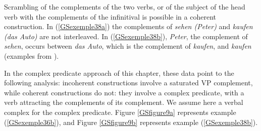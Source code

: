 \documentclass[output=paper]{langsci/langscibook}
\begin{document}
{\begin{exe}
\begin{xlist}
		\label{GSexemple37d}	
		
		\label{GSexemple37e}
		
		\label{GSexemple37f}
		
		\label{GSexemple37g}
		
		\end{xlist}
\end{exe}

Scrambling of the complements of the two verbs, or of the subject of the head verb with the complements of the infinitival is possible in a coherent construction. In (\ref{GSexemple38a}) the complements of \textit{sehen (Peter)} and \textit{kaufen (das Auto)} are not interleaved. In (\ref{GSexemple38b}), \textit{Peter}, the complement of \textit{sehen}, occurs between \textit{das Auto}, which is the complement of \textit{kaufen}, and \textit{kaufen} (examples from \citealt{HN98a}).

\begin{exe}
	\ex \label{GSexemple38} 
	\begin{xlist}
        \label{GSexemple38a}

		\label{GSexemple38b}
		\end{xlist}
\end{exe}

In the complex predicate approach of this chapter, these data point to the following analysis: incoherent constructions involve a saturated VP complement, while coherent constructions do not: they involve a complex predicate, with a verb attracting the complements of its complement. We assume here a verbal complex for the complex predicate. Figure \ref{GSfigure9a} represents example (\ref{GSexemple36b}), and Figure \ref{GSfigure9b} represents example (\ref{GSexemple38b}).

}
\end{document}
